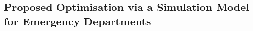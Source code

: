 \documentclass[11pt]{article} %
\begin{document}

\subsection{Proposed Optimisation via a Simulation Model for Emergency Departments}
\label{ssec:two-phase}
\end{document}
